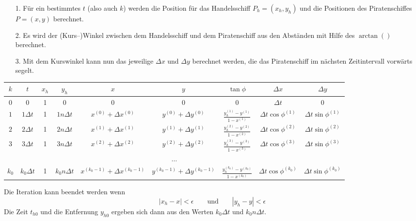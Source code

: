 \documentclass[paper=a4,notitlepage,parskip=half,plainheadsepline]{scrartcl}
\begin{document}
\begin{enumerate}
\item[1.] Für ein bestimmtes $t$ (also auch $k$) werden die Position für das Handelsschiff $P_h=(x_h, y_h)$ und die Positionen des Piratenschiffes $P=(x, y)$ berechnet.
\item[2.] Es wird der (Kurs--)Winkel zwischen dem Handelsschiff und dem Piratenschiff aus den Abständen mit Hilfe des $\arctan()$ berechnet.
\item[3.] Mit dem Kurswinkel kann nun das jeweilige $\Delta x$ und $\Delta y$ berechnet werden, die das Piratenschiff im nächsten Zeitintervall vorwärts segelt.
\end{enumerate}
\renewcommand{\arraystretch}{1.8}
\begin{tabular}{|c|c|c|c|c|c|c|c|c|}
\hline
\rowcolor{lightgray}
$k$ & $t$           & $x_h$ & $y_h$         & $x$                           & $y$                               & $\tan \phi$ & $\Delta x$ & $\Delta y$ \\
\hline
$0$ & $0$         & 1     &$0$ &$0$       & $0$                             &$0$& $\Delta t$          & $0$ \\
\hline 
$1$ & $1\Delta t$ & 1     &$1n\Delta t$   &$x^{(0)} +\Delta x^{(0)}$    & $y^{(0)} +\Delta y^{(0)}$       &$\frac{y_h^{(1)}-y^{(1)}}{1-x^{(1)}}$&  $\Delta t \cos \phi^{(1)}$ & $\Delta t \sin \phi^{(1)}$\\
\hline 
$2$ & $2\Delta t$ & 1     &$2n\Delta t$   &$x^{(1)} +\Delta x^{(1)}$    & $y^{(1)} +\Delta y^{(1)}$       &$\frac{y_h^{(2)}-y^{(2)}}{1-x^{(2)}}$& $\Delta t \cos \phi^{(2)}$ & $\Delta t \sin \phi^{(2)}$ \\
\hline 
$3$ & $3\Delta t$ & 1     &$3n\Delta t$   &$x^{(2)} +\Delta x^{(2)}$    & $y^{(2)} +\Delta y^{(2)}$       &$\frac{y_h^{(3)}-y^{(3)}}{1-x^{(3)}}$& $\Delta t \cos \phi^{(3)}$ & $\Delta t \sin \phi^{(3)}$ \\
\hline 
\multicolumn{9}{|c|}{$\ldots$}\\
\hline 
$k_0$ & $k_0\Delta t$ & 1     &$k_0 n\Delta t$   &$x^{(k_0-1)} +\Delta x^{(k_0-1)}$& $y^{(k_0-1)} +\Delta y^{(k_0-1)}$   &$\frac{y_h^{(k_0)}-y^{(k_0)}}{1-x^{(k_0)}}$& $\Delta t \cos \phi^{(k_0)}$ & $\Delta t \sin \phi^{(k_0)}$ \\
\hline
\end{tabular}

Die Iteration kann beendet werden wenn
$$|x_h - x| < \epsilon   \qquad \textrm{und} \qquad |y_h - y| < \epsilon $$ 
Die Zeit $t_{h0}$ und die Entfernung $y_{h0}$ ergeben sich dann aus den Werten $k_{0} \Delta t$ und $k_{0} n \Delta t$.
\end{document}
